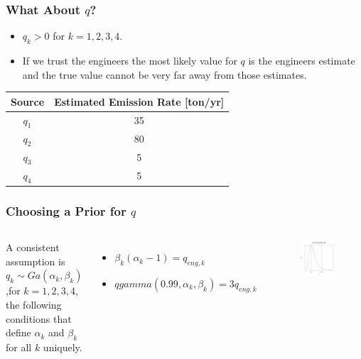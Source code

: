 \documentclass[11pt]{beamer}
\theoremstyle{plain}
\theoremstyle{definition}
\begin{document}
\begin{frame}
\frametitle{What About $q$?}
\begin{itemize}
\item $q_{k}>0$ for $k=1,2,3,4$.
\item If we trust the engineers the most likely value for $q$ is the engineers estimate and the 
true value cannot be very far away from those estimates.
\end{itemize}

\begin{table}[H]
\centering
\begin{tabular}{|c|c|}
\hline 
Source & Estimated Emission Rate {[}ton/yr{]}\tabularnewline
\hline 
\hline 
$q_{1}$ & 35\tabularnewline
\hline 
$q_{2}$ & 80\tabularnewline
\hline 
$q_{3}$ & 5\tabularnewline
\hline 
$q_{4}$ & 5\tabularnewline
\hline 
\end{tabular}
\end{table}
\end{frame}

\begin{frame}
\frametitle{Choosing a Prior for $q$}
\begin{columns}[c]
\column{2.2in}
A consistent assumption is $q_{k}\sim Ga(\alpha_{k},\beta_{k})$,for $k=1,2,3,4$,
the following conditions that define $\alpha_{k}$ and $\beta_{k}$ for all $k$ uniquely.

\begin{itemize}
\item $\beta_{k}(\alpha_{k}-1)=q_{eng,k}$
\item $qgamma(0.99,\alpha_{k},\beta_{k})=3q_{eng,k}$
\end{itemize}
\column{1.5in}
\begin{figure}
\includegraphics[scale=0.3]{gamma_generic}
\end{figure}
\end{columns}
\end{frame}
\end{document}
